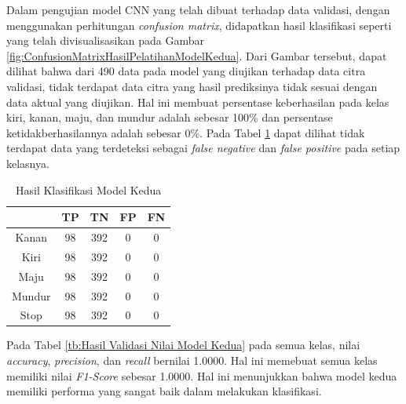 Dalam pengujian model CNN yang telah dibuat terhadap data validasi, dengan menggunakan perhitungan \emph{confusion matrix}, didapatkan hasil klasifikasi seperti yang telah divisualisasikan pada Gambar \ref{fig:ConfusionMatrixHasilPelatihanModelKedua}. Dari Gambar tersebut, dapat dilihat bahwa dari 490 data pada model yang diujikan terhadap data citra validasi, tidak terdapat data citra yang hasil prediksinya tidak sesuai dengan data aktual yang diujikan. Hal ini membuat persentase keberhasilan pada kelas kiri, kanan, maju, dan mundur adalah sebesar 100\% dan persentase ketidakberhasilannya adalah sebesar 0\%. Pada Tabel \ref{tb:Hasil Klasifikasi Model Kedua} dapat dilihat tidak terdapat data yang terdeteksi sebagai \emph{false negative} dan \emph{false positive} pada setiap kelasnya.

\begin{table}[H]
  \centering
  \caption{Hasil Klasifikasi Model Kedua}
  \label{tb:Hasil Klasifikasi Model Kedua}
  \begin{tabular}{|c|c|c|c|c|}
    \hline
    \rowcolor[HTML]{9B9B9B} 
    \cellcolor[HTML]{9B9B9B} & TP & TN  & FP & FN \\ \hline
    Kanan                    & 98 & 392 & 0  & 0  \\ \hline
    Kiri                     & 98 & 392 & 0  & 0  \\ \hline
    Maju                     & 98 & 392 & 0  & 0  \\ \hline
    Mundur                   & 98 & 392 & 0  & 0  \\ \hline
    Stop                     & 98 & 392 & 0  & 0  \\ \hline
    \end{tabular}
    \end{table}


  Pada Tabel \ref{tb:Hasil Validasi Nilai Model Kedua} pada semua kelas, nilai \emph{accuracy}, \emph{precision}, dan \emph{recall} bernilai 1.0000. Hal ini memebuat semua kelas memiliki nilai \emph{F1-Score} sebesar 1.0000. Hal ini menunjukkan bahwa model kedua memiliki performa yang sangat baik dalam melakukan klasifikasi.  


